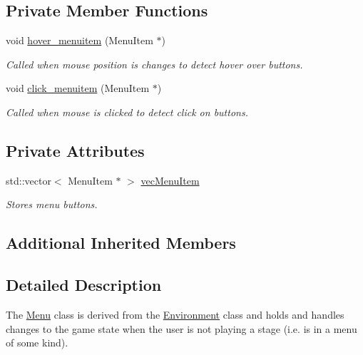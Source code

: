 \subsection*{Private Member Functions}
\begin{DoxyCompactItemize}
\item 
void \hyperlink{class_menu_a7e39cf7f3f6404eb670e34f4e4303f92}{hover\+\_\+menuitem} (Menu\+Item $\ast$)\hypertarget{class_menu_a7e39cf7f3f6404eb670e34f4e4303f92}{}\label{class_menu_a7e39cf7f3f6404eb670e34f4e4303f92}

\begin{DoxyCompactList}\small\item\em Called when mouse position is changes to detect hover over buttons. \end{DoxyCompactList}\item 
void \hyperlink{class_menu_a1bc5693b23c0545f153b8d472256b672}{click\+\_\+menuitem} (Menu\+Item $\ast$)\hypertarget{class_menu_a1bc5693b23c0545f153b8d472256b672}{}\label{class_menu_a1bc5693b23c0545f153b8d472256b672}

\begin{DoxyCompactList}\small\item\em Called when mouse is clicked to detect click on buttons. \end{DoxyCompactList}\end{DoxyCompactItemize}
\subsection*{Private Attributes}
\begin{DoxyCompactItemize}
\item 
std\+::vector$<$ Menu\+Item $\ast$ $>$ \hyperlink{class_menu_a5392cc6eccd7473ee634e976106466d9}{vec\+Menu\+Item}\hypertarget{class_menu_a5392cc6eccd7473ee634e976106466d9}{}\label{class_menu_a5392cc6eccd7473ee634e976106466d9}

\begin{DoxyCompactList}\small\item\em Stores menu buttons. \end{DoxyCompactList}\end{DoxyCompactItemize}
\subsection*{Additional Inherited Members}


\subsection{Detailed Description}
The \hyperlink{class_menu}{Menu} class is derived from the \hyperlink{class_environment}{Environment} class and holds and handles changes to the game state when the user is not playing a stage (i.\+e. is in a menu of some kind). 

